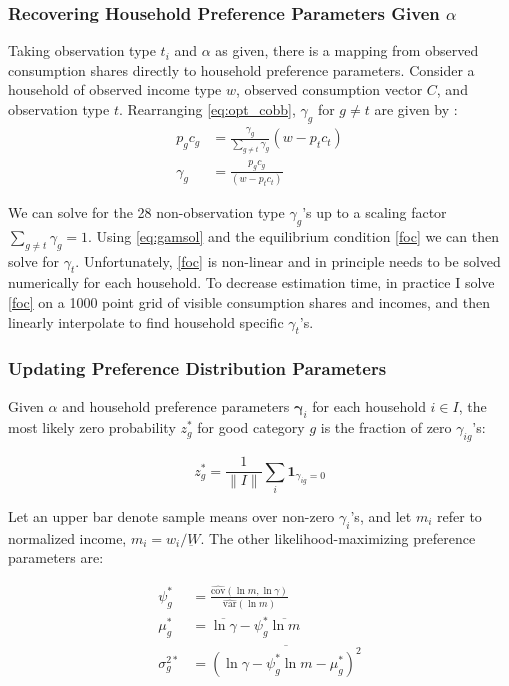 \documentclass[12pt]{article}
\begin{document}
\subsubsection{Recovering Household Preference Parameters Given $\alpha$}
\label{sec:upd_prefs}

Taking observation type $t_i$ and $\alpha$ as given, there is a mapping from observed consumption shares directly to household preference parameters.  Consider a household of observed income type $w$, observed consumption vector $C$, and observation type $t$.  Rearranging \eqref{eq:opt_cobb}, $\gamma_g$ for $g\neq t$ are given by :
\begin{align}
	p_gc_g &= \frac{\gamma_g}{\sum_{g\neq t}\gamma_g}  \left(w-  p_t c_t\right) \nonumber \\
	\label{eq:gamsol}
	\gamma_g &= \frac{p_g c_g}{\left(w- p_t c_t\right)} 
\end{align}

We can solve for the 28 non-observation type $\gamma_g$'s up to a scaling factor $\sum_{g\neq t}\gamma_g = 1$.  Using \eqref{eq:gamsol} and the equilibrium condition \eqref{foc} we can then solve for $\gamma_t$.  Unfortunately, \eqref{foc} is non-linear and in principle needs to be solved numerically for each household.  To decrease estimation time, in practice I solve \eqref{foc} on a 1000 point grid of visible consumption shares and incomes, and then linearly interpolate to find household specific $\gamma_t$'s.

\subsubsection{Updating Preference Distribution Parameters}

Given $\alpha$ and household preference parameters $\boldsymbol{\gamma}_i$ for each household $i \in I$, the most likely zero probability $z_g^*$ for good category $g$ is the fraction of zero $\gamma_{ig}$'s:

\begin{equation}
    z_g^* = \frac{1}{\|I\|} \sum_{i} \mathbf{1}_{\gamma_{ig} = 0} \nonumber
\end{equation}

Let an upper bar denote sample means over non-zero $\gamma_i$'s, and let $m_i$ refer to normalized income, $m_i = w_i/\underbar{W}$.  The other likelihood-maximizing preference parameters are:

\begin{align}
    \psi_g^* &= \frac{\hat{\mbox{cov}}(\ln m, \ln \gamma)}{\hat{\mbox{var}}(\ln m)} \nonumber \\
    \mu_g^* &= \overline{\ln \gamma} - \psi_g^* \overline{\ln m} \nonumber \\
    \sigma_g^{2*} &= \overline{\left(\ln \gamma - \psi_g^* \ln m - \mu_g^*\right)^2}
\end{align}
\end{document}
